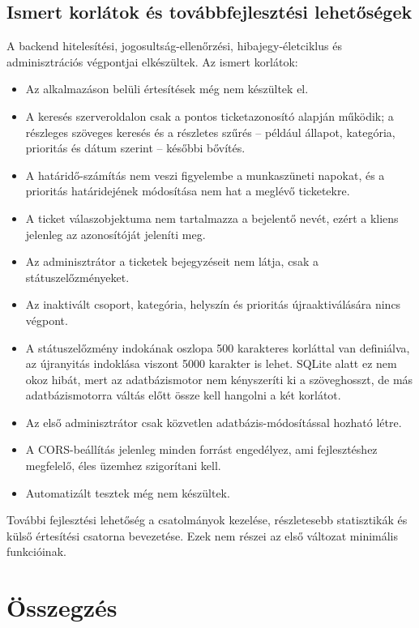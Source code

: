 \documentclass[12pt, a4paper, twoside]{article}
\begin{document}
\subsection{Ismert korlátok és továbbfejlesztési lehetőségek}

A backend hitelesítési, jogosultság-ellenőrzési, hibajegy-életciklus és adminisztrációs végpontjai elkészültek. Az ismert korlátok:

\begin{itemize}
    \item Az alkalmazáson belüli értesítések még nem készültek el.
    \item A keresés szerveroldalon csak a pontos ticketazonosító alapján működik; a részleges szöveges keresés és a részletes szűrés -- például állapot, kategória, prioritás és dátum szerint -- későbbi bővítés.
    \item A határidő-számítás nem veszi figyelembe a munkaszüneti napokat, és a prioritás határidejének módosítása nem hat a meglévő ticketekre.
    \item A ticket válaszobjektuma nem tartalmazza a bejelentő nevét, ezért a kliens jelenleg az azonosítóját jeleníti meg.
    \item Az adminisztrátor a ticketek bejegyzéseit nem látja, csak a státuszelőzményeket.
    \item Az inaktivált csoport, kategória, helyszín és prioritás újraaktiválására nincs végpont.
    \item A státuszelőzmény indokának oszlopa 500 karakteres korláttal van definiálva, az újranyitás indoklása viszont 5000 karakter is lehet. SQLite alatt ez nem okoz hibát, mert az adatbázismotor nem kényszeríti ki a szöveghosszt, de más adatbázismotorra váltás előtt össze kell hangolni a két korlátot.
    \item Az első adminisztrátor csak közvetlen adatbázis-módosítással hozható létre.
    \item A CORS-beállítás jelenleg minden forrást engedélyez, ami fejlesztéshez megfelelő, éles üzemhez szigorítani kell.
    \item Automatizált tesztek még nem készültek.
\end{itemize}

További fejlesztési lehetőség a csatolmányok kezelése, részletesebb statisztikák és külső értesítési csatorna bevezetése. Ezek nem részei az első változat minimális funkcióinak.

\section{Összegzés}
\end{document}
